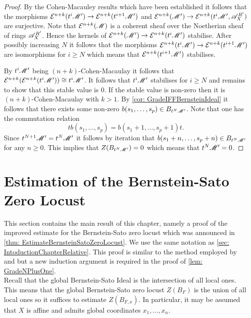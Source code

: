 \begin{proof}
  By the Cohen-Macauley results which have been established it follows that the morphisms $\mathcal{E}^{n+k}( t^i\mathscr{M}') \to  \mathcal{E}^{n+k}(t^{i+1}\mathscr{M}')$ and $\mathcal{E}^{n+k}(\mathscr{M}') \to \mathcal{E}^{n+k} (t^i\mathscr{M}',\allowbreak \mathscr{A}_X^{R'})$ are surjective.
  Note that $\mathcal{E}^{n+k}(\mathscr{M})$ is a coherent sheaf over the Noetherian sheaf of rings $\mathscr{A}_X^{R'}$.
  Hence the kernels of $\mathcal{E}^{n+k}(\mathscr{M}') \to \mathcal{E}^{n+k} (t^i\mathscr{M}')$ stabilise.
  After possibly increasing $N$ it follows that the morphisms $\mathcal{E}^{n+k}(t^i\mathscr{M}') \to  \mathcal{E}^{n+k}(t^{i+1}\mathscr{M}')$ are isomorphisms for $i\geq N$ which means that $\mathcal{E}^{n+k}(t^{i+1}\mathscr{M}')$ stabilises.

  By $t^i \mathscr{M}'$ being $(n+k)$-Cohen-Macaulay it follows that $\mathcal{E}^{n+k}(\mathcal{E}^{n+k}(t^i\mathscr{M}')) \cong t^i\mathscr{M}'$.
  It follows that $t^i \mathscr{M}'$ stabilises for $i\geq N$ and remains to show that this stable value is $0$.
  If the stable value is non-zero then it is $(n+k)$-Cohen-Macaulay with $k>1$.
  By \cref{cor: GradeIFFBernsteinIdeal} it follows that there exists some non-zero $b(s_1,\ldots,s_p) \in B_{t^N\mathscr{M}'}$.
  Note that one has the commutation relation
  $$tb(s_1,\ldots,s_p) = b(s_1+1,\ldots, s_p + 1)t.$$
  Since $t^{N+1}\mathscr{M}' = t^N\mathscr{M}'$ it follows by iteration that $b(s_1+n,\ldots, s_p + n)\in B_{t^N \mathscr{M}'}$ for any $n\geq 0$.
  This implies that $Z(B_{t^N\mathscr{M}'}) = 0$ which means that $t^N\mathscr{M}' = 0$.
\end{proof}
\section{Estimation of the Bernstein-Sato Zero Locust}
This section contains the main result of this chapter, namely a proof of the improved estimate for the Bernstein-Sato zero locust which was announced in \cref{thm: EstimateBernsteinSatoZeroLocust}.
We use the same notation as \cref{sec: IntoductionChapterRelative}.
This proof is similar to the method employed by \cite{lichtin1989poles} and \cite{kashiwara1976b} but a new induction argument is required in the proof of \cref{lem: GradeNPlusOne}.\\

\noindent
Recall that the global Bernstein-Sato Ideal is the intersection of all local ones.
This means that the global Bernstein-Sato zero locust $Z(B_F)$ is the union of all local ones so it suffices to estimate $Z(B_{F,x})$.
In particular, it may be assumed that $X$ is affine and admits global coordinates $x_1,\ldots,x_n$.

